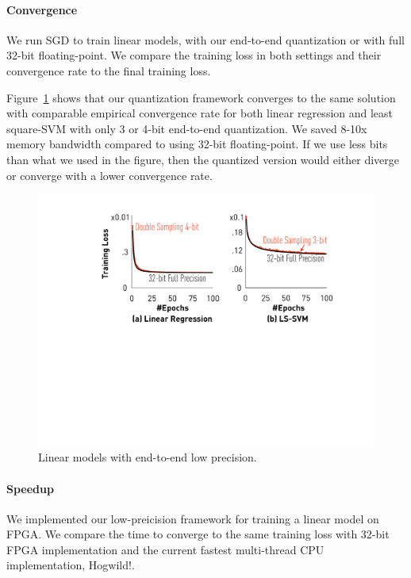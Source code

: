 \documentclass{article}
\begin{document}
\paragraph{Convergence}
We run SGD to train linear models, with our end-to-end quantization or with full 32-bit floating-point. We compare the training loss in both settings and their convergence rate to the final training loss.

Figure~\ref{fig:convergence} shows that our quantization framework
converges to the same solution with comparable
empirical convergence rate for both linear regression and least square-SVM
with only 3 or 4-bit end-to-end quantization. We saved 8-10x memory bandwidth compared to using 32-bit floating-point. If we use less bits than what we used in the figure, then the quantized version would either diverge or converge with a lower convergence rate.

\begin{figure}[t]
\centering
\includegraphics[width=\columnwidth]{final-experiments/linearmodel} 
\caption{Linear models with end-to-end low precision.}
\label{fig:convergence}
\end{figure}

\paragraph{Speedup}
We implemented our low-preicision framework for training a linear model on FPGA. We compare the time to converge to the same training loss with 32-bit FPGA implementation and the current fastest multi-thread CPU implementation, Hogwild!.
\end{document}
